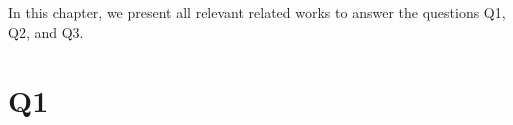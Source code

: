In this chapter, we present all relevant related works to answer the questions Q1, Q2, and Q3. 

\section{Q1}




